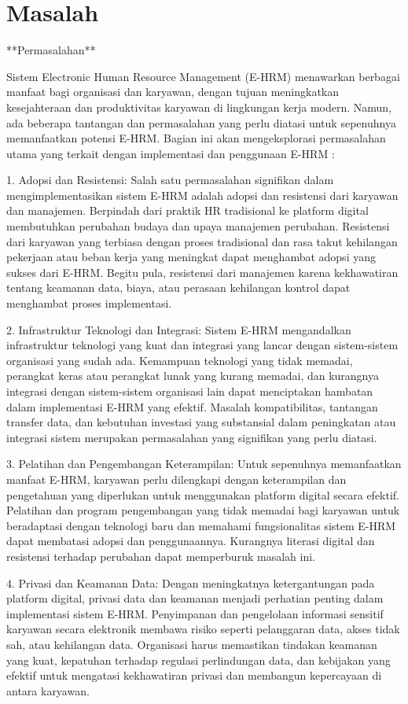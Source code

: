 \documentclass[12pt]{article}
\begin{document}
\section*{Masalah}
**Permasalahan**

Sistem Electronic Human Resource Management (E-HRM) menawarkan berbagai manfaat bagi organisasi dan karyawan, dengan tujuan meningkatkan kesejahteraan dan produktivitas karyawan di lingkungan kerja modern. Namun, ada beberapa tantangan dan permasalahan yang perlu diatasi untuk sepenuhnya memanfaatkan potensi E-HRM. Bagian ini akan mengeksplorasi permasalahan utama yang terkait dengan implementasi dan penggunaan E-HRM :

1. Adopsi dan Resistensi:
Salah satu permasalahan signifikan dalam mengimplementasikan sistem E-HRM adalah adopsi dan resistensi dari karyawan dan manajemen. Berpindah dari praktik HR tradisional ke platform digital membutuhkan perubahan budaya dan upaya manajemen perubahan. Resistensi dari karyawan yang terbiasa dengan proses tradisional dan rasa takut kehilangan pekerjaan atau beban kerja yang meningkat dapat menghambat adopsi yang sukses dari E-HRM. Begitu pula, resistensi dari manajemen karena kekhawatiran tentang keamanan data, biaya, atau perasaan kehilangan kontrol dapat menghambat proses implementasi.

2. Infrastruktur Teknologi dan Integrasi:
Sistem E-HRM mengandalkan infrastruktur teknologi yang kuat dan integrasi yang lancar dengan sistem-sistem organisasi yang sudah ada. Kemampuan teknologi yang tidak memadai, perangkat keras atau perangkat lunak yang kurang memadai, dan kurangnya integrasi dengan sistem-sistem organisasi lain dapat menciptakan hambatan dalam implementasi E-HRM yang efektif. Masalah kompatibilitas, tantangan transfer data, dan kebutuhan investasi yang substansial dalam peningkatan atau integrasi sistem merupakan permasalahan yang signifikan yang perlu diatasi.

3. Pelatihan dan Pengembangan Keterampilan:
Untuk sepenuhnya memanfaatkan manfaat E-HRM, karyawan perlu dilengkapi dengan keterampilan dan pengetahuan yang diperlukan untuk menggunakan platform digital secara efektif. Pelatihan dan program pengembangan yang tidak memadai bagi karyawan untuk beradaptasi dengan teknologi baru dan memahami fungsionalitas sistem E-HRM dapat membatasi adopsi dan penggunaannya. Kurangnya literasi digital dan resistensi terhadap perubahan dapat memperburuk masalah ini.

4. Privasi dan Keamanan Data:
Dengan meningkatnya ketergantungan pada platform digital, privasi data dan keamanan menjadi perhatian penting dalam implementasi sistem E-HRM. Penyimpanan dan pengelolaan informasi sensitif karyawan secara elektronik membawa risiko seperti pelanggaran data, akses tidak sah, atau kehilangan data. Organisasi harus memastikan tindakan keamanan yang kuat, kepatuhan terhadap regulasi perlindungan data, dan kebijakan yang efektif untuk mengatasi kekhawatiran privasi dan membangun kepercayaan di antara karyawan.
\end{document}
